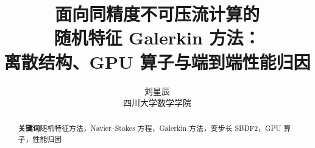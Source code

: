 \documentclass[UTF8,fontset=fandol,zihao=-4]{ctexart}
\title{面向同精度不可压流计算的\\随机特征 Galerkin 方法：\\离散结构、GPU 算子与端到端性能归因}
\author{刘星辰\\四川大学数学学院}
\date{}
\begin{document}
\maketitle
\begin{abstract}

\par\smallskip
\noindent\textbf{关键词}\quad 随机特征方法，Navier--Stokes 方程，Galerkin 方法，变步长 SBDF2，GPU 算子，性能归因
\end{abstract}




\FloatBarrier


\end{document}
